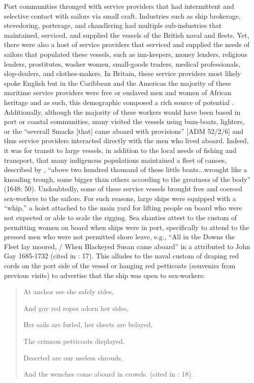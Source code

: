 Port communities thronged with service providers that had intermittent and selective contact with sailors via small craft. Industries such as ship brokerage, stevedoring, porterage, and chandlering had multiple sub-industries that maintained, serviced, and supplied the vessels of the British naval and  fleets. Yet, there were also a host of service providers that serviced and supplied the needs of sailors that populated these vessels, such as inn-keepers, money lenders, religious leaders, prostitutes, washer women, small-goods traders, medical professionals, slop-dealers, and clothes-makers. In Britain, these service providers most likely spoke English but in the Caribbean and the Americas the majority of these maritime service providers were free or enslaved men and women of African heritage \citep[259]{Jarvis2010} and as such, this demographic composed a rich source of potential . Additionally, although the majority of these workers would have been based in port or coastal communities, many visited the vessels using bum-boats, lighters, or the “severall Smacks [that] came aboard with provisions” [ADM 52/2/6] and thus service providers interacted directly with the men who lived aboard. Indeed, it was for transit to large vessels, in addition to the local needs of fishing and transport, that many indigenous populations maintained a fleet of canoes, described by \citeauthor{Gage1648}, “above two hundred thousand of these little boats...wrought like a kneading trough, some bigger than others according to the greatness of the body” (1648: 50). Undoubtedly, some of these service vessels brought free and coerced sex-workers to the sailors. For such reasons, large ships were equipped with a “whip,” a hoist attached to the main yard for lifting people on board who were not expected or able to scale the rigging. Sea shanties attest to the custom of permitting women on board when ships were in port, specifically to attend to the pressed men who were not permitted shore leave, e.g.,  “All in the Downs the Fleet lay moored, / When Blackeyed Susan came aboard” in a  attributed to John Gay 1685-1732 (cited in \citealt{Hugill1969}: 17). This  alludes to the naval custom of draping red cords on the port side of the vessel or hanging red petticoats (souvenirs from previous visits) to advertise that the ship was open to sex-workers: 

\begin{quotation}
At anchor see she safely rides, 

And gay red ropes adorn her sides, 

Her sails are furled, her sheets are belayed, 

The crimson petticoats displayed. 

Deserted are our useless shrouds, 

And the wenches come aboard in crowds. (cited in \citealt{Hugill1969}: 18).
\end{quotation}

